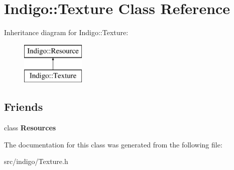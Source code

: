 \hypertarget{class_indigo_1_1_texture}{}\section{Indigo\+:\+:Texture Class Reference}
\label{class_indigo_1_1_texture}
Inheritance diagram for Indigo\+:\+:Texture\+:\begin{figure}[H]
\begin{center}
\leavevmode
\includegraphics[height=2.000000cm]{class_indigo_1_1_texture}
\end{center}
\end{figure}
\subsection*{Friends}
\begin{DoxyCompactItemize}
\item 
\mbox{\label{class_indigo_1_1_texture_a74b3f77e4a7285c624d30192f9643876}} 
class {\bfseries Resources}
\end{DoxyCompactItemize}


The documentation for this class was generated from the following file\+:\begin{DoxyCompactItemize}
\item 
src/indigo/Texture.\+h\end{DoxyCompactItemize}
